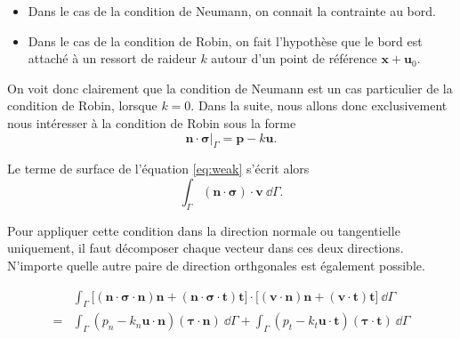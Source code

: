 \documentclass[12pt]{article}
\newcommand{\uu}{\mathbf{u}}
\newcommand{\vv}{\mathbf{v}}
\newcommand{\xx}{\mathbf{x}}
\newcommand{\stress}{\boldsymbol{\sigma}}
\newcommand{\shapef}{\boldsymbol{\tau}}
\begin{document}
\begin{itemize}
    \item Dans le cas de la condition de Neumann, on connait la contrainte au 
    bord.
    \item Dans le cas de la condition de Robin, on fait l'hypothèse que le bord 
    est attaché à un ressort de raideur $k$ autour d'un point de 
    référence $\xx+\mathbf{u}_0$.
\end{itemize}

On voit donc clairement que la condition de Neumann est un cas particulier de la
condition de Robin, lorsque $k=0$. Dans la suite, nous allons donc exclusivement 
nous intéresser à la condition de Robin sous la forme
\begin{equation}
    \mathbf{n} \cdot \stress \vert_{\Gamma} = \mathbf{p} - k \mathbf{u}.
\end{equation}

Le terme de surface de l'équation \eqref{eq:weak} s'écrit alors
\begin{equation}
    \int_{\Gamma} (\mathbf{n} \cdot \stress) \cdot \vv \:\dd\Gamma.
\end{equation}

Pour appliquer cette condition dans la direction normale ou tangentielle 
uniquement, il faut décomposer chaque vecteur dans ces deux directions. 
N'importe quelle autre paire de direction orthgonales est également possible.

\begin{equation}
    \begin{aligned}
        &\int_{\Gamma} \big[ 
            (\mathbf{n}\cdot \stress \cdot \mathbf{n}) \mathbf{n}+ 
            (\mathbf{n}\cdot \stress \cdot \mathbf{t}) \mathbf{t}
        \big] \cdot \big[
            (\vv \cdot \mathbf{n}) \mathbf{n} + 
            (\vv \cdot \mathbf{t}) \mathbf{t}
        \big] \:\dd\Gamma\\
        = &\int_{\Gamma} (p_n - k_n \uu \cdot \mathbf{n}) (\shapef \cdot \mathbf{n}) \: \dd \Gamma+
        \int_{\Gamma} (p_t - k_t \uu \cdot \mathbf{t}) (\shapef \cdot \mathbf{t}) \: \dd \Gamma
    \end{aligned}
\end{equation}
\end{document}
